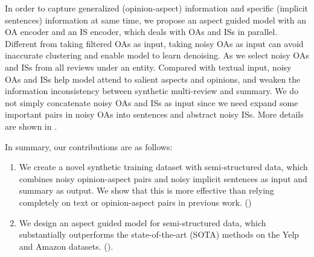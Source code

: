 In order to capture generalized (opinion-aspect) information and specific (implicit sentences) information at same time,
we propose an aspect guided model with an OA encoder and
an IS encoder, which deals with OAs and ISs in parallel.
Different from taking filtered OAs as input, 
taking noisy OAs as input can
avoid inaccurate clustering
and enable model to learn denoising.
As we select noisy OAs and ISs from all reviews under an entity.
Compared with textual input,
noisy OAs and ISs help model attend to salient aspects and opinions,
and weaken the information inconsistency between synthetic multi-review and summary.
We do not simply concatenate noisy OAs and ISs as input since we need expand some important pairs in noisy OAs into sentences and
abstract noisy ISs.
More details are shown in .

In summary, our contributions are as follows:
\begin{enumerate}
\item We create a novel synthetic training dataset with 
semi-structured data, which combines noisy opinion-aspect pairs 
and noisy implicit sentences as input and
summary as output.
We show that this is more effective than relying completely on
text or opinion-aspect pairs in previous work. ()
\item We design an aspect guided model for semi-structured data,
which substantially outperforms the 
state-of-the-art (SOTA) methods on the Yelp and Amazon datasets. ().
\end{enumerate}

